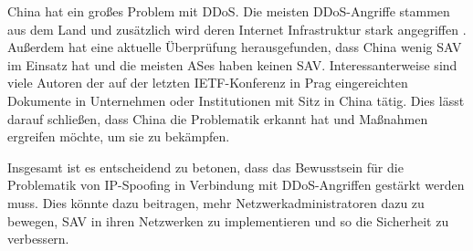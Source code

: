\documentclass[sigplan,screen]{acmart}
\begin{document}
China hat ein großes Problem mit DDoS. Die meisten DDoS-Angriffe stammen aus dem Land und zusätzlich wird deren Internet Infrastruktur stark angegriffen \cite{cloudflaeDDoS01} \cite{technode01}. Außerdem hat eine aktuelle Überprüfung \cite{largemeasurment01} herausgefunden, dass China wenig SAV im Einsatz hat und die meisten ASes haben keinen SAV. Interessanterweise sind viele Autoren der auf der letzten IETF-Konferenz in Prag eingereichten Dokumente in Unternehmen oder Institutionen mit Sitz in China tätig. Dies lässt darauf schließen, dass China die Problematik erkannt hat und Maßnahmen ergreifen möchte, um sie zu bekämpfen.

Insgesamt ist es entscheidend zu betonen, dass das Bewusstsein für die Problematik von IP-Spoofing in Verbindung mit DDoS-Angriffen gestärkt werden muss. Dies könnte dazu beitragen, mehr Netzwerkadministratoren dazu zu bewegen, SAV in ihren Netzwerken zu implementieren und so die Sicherheit zu verbessern.




\appendix
\end{document}
